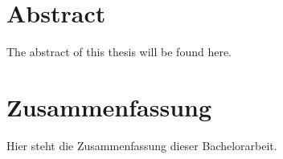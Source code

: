\section*{Abstract}

The abstract of this thesis will be found here.

\pagebreak

\section*{Zusammenfassung}

Hier steht die Zusammenfassung dieser Bachelorarbeit.
